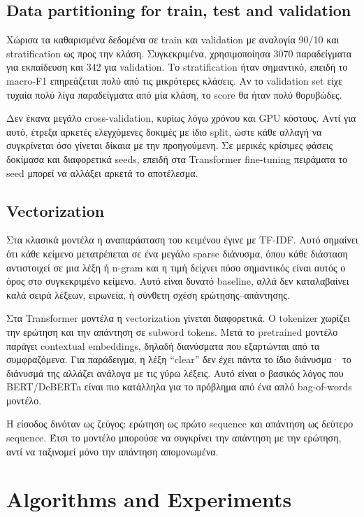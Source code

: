 \documentclass[12pt]{fphw}
\begin{document}
\subsection{Data partitioning for train, test and validation}

Χώρισα τα καθαρισμένα δεδομένα σε train και validation με αναλογία 90/10 και stratification ως προς την κλάση. Συγκεκριμένα, χρησιμοποίησα 3070 παραδείγματα για εκπαίδευση και 342 για validation. Το stratification ήταν σημαντικό, επειδή το macro-F1 επηρεάζεται πολύ από τις μικρότερες κλάσεις. Αν το validation set είχε τυχαία πολύ λίγα παραδείγματα από μία κλάση, το score θα ήταν πολύ θορυβώδες.

Δεν έκανα μεγάλο cross-validation, κυρίως λόγω χρόνου και GPU κόστους. Αντί για αυτό, έτρεξα αρκετές ελεγχόμενες δοκιμές με ίδιο split, ώστε κάθε αλλαγή να συγκρίνεται όσο γίνεται δίκαια με την προηγούμενη. Σε μερικές κρίσιμες φάσεις δοκίμασα και διαφορετικά seeds, επειδή στα Transformer fine-tuning πειράματα το seed μπορεί να αλλάξει αρκετά το αποτέλεσμα.

\subsection{Vectorization}

Στα κλασικά μοντέλα η αναπαράσταση του κειμένου έγινε με TF-IDF. Αυτό σημαίνει ότι κάθε κείμενο μετατρέπεται σε ένα μεγάλο sparse διάνυσμα, όπου κάθε διάσταση αντιστοιχεί σε μια λέξη ή n-gram και η τιμή δείχνει πόσο σημαντικός είναι αυτός ο όρος στο συγκεκριμένο κείμενο. Αυτό είναι δυνατό baseline, αλλά δεν καταλαβαίνει καλά σειρά λέξεων, ειρωνεία, ή σύνθετη σχέση ερώτησης--απάντησης.

Στα Transformer μοντέλα η vectorization γίνεται διαφορετικά. Ο tokenizer χωρίζει την ερώτηση και την απάντηση σε subword tokens. Μετά το pretrained μοντέλο παράγει contextual embeddings, δηλαδή διανύσματα που εξαρτώνται από τα συμφραζόμενα. Για παράδειγμα, η λέξη ``clear'' δεν έχει πάντα το ίδιο διάνυσμα· το διάνυσμά της αλλάζει ανάλογα με τις γύρω λέξεις. Αυτό είναι ο βασικός λόγος που BERT/DeBERTa είναι πιο κατάλληλα για το πρόβλημα από ένα απλό bag-of-words μοντέλο.

Η είσοδος δινόταν ως ζεύγος: ερώτηση ως πρώτο sequence και απάντηση ως δεύτερο sequence. Έτσι το μοντέλο μπορούσε να συγκρίνει την απάντηση με την ερώτηση, αντί να ταξινομεί μόνο την απάντηση απομονωμένα.

\section{Algorithms and Experiments}
\end{document}
